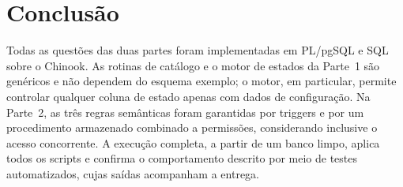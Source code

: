 \documentclass[11pt,a4paper]{article}
\begin{document}
\section{Conclusão}

Todas as questões das duas partes foram implementadas em PL/pgSQL e SQL sobre o Chinook. As rotinas de catálogo e o
motor de estados da Parte~1 são genéricos e não dependem do esquema exemplo; o motor, em particular, permite
controlar qualquer coluna de estado apenas com dados de configuração. Na Parte~2, as três regras semânticas foram
garantidas por triggers e por um procedimento armazenado combinado a permissões, considerando inclusive o acesso
concorrente. A execução completa, a partir de um banco limpo, aplica todos os scripts e confirma o comportamento
descrito por meio de testes automatizados, cujas saídas acompanham a entrega.
\end{document}
